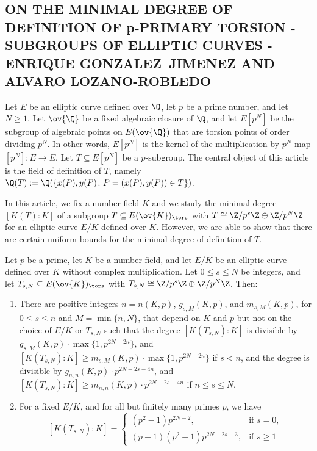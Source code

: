 \subsection{ON THE MINIMAL DEGREE OF DEFINITION OF p-PRIMARY TORSION - SUBGROUPS OF ELLIPTIC CURVES - ENRIQUE GONZALEZ–JIMENEZ AND ALVARO LOZANO-ROBLEDO}

Let $E$ be an elliptic curve defined over $\Q$, let $p$ be a prime number, and let $N \geq 1$. Let $\ov{\Q}$ be a fixed algebraic closure of $\Q$, and let $E[p^N]$ be the subgroup of algebraic points on $E(\ov{\Q})$ that are torsion points of order dividing $p^N$. In other words, $E[p^N]$ is the kernel of the multiplication-by-$p^N$ map $[p^N]: E \to E$. Let $T \subseteq E[p^N]$ be a $p$-subgroup. The central object of this article is the field of definition of $T$, namely $\Q(T):= \Q(\{x(P), y(P) \colon P= (x(P), y(P)) \in T \})$. 


In this article, we fix a number field $K$ and we study the minimal degree $[K(T) \colon K]$ of a subgroup $T \subseteq E(\ov{K})_\tors$ with $T \cong \Z/p^s\Z \oplus \Z/p^N\Z$ for an elliptic curve $E/K$ defined over $K$. However, we are able to show that there are certain uniform bounds for the minimal degree of definition of $T$.


\begin{thm} %
Let $p$ be a prime, let $K$ be a number field, and let $E/K$ be an elliptic curve defined over $K$ without complex multiplication. Let $0 \leq s \leq N$ be integers, and let $T_{s,N} \subseteq E(\ov{K})_\tors$ with $T_{s,N} \cong \Z/p^s\Z \oplus \Z/p^N\Z$. Then:
	\begin{enumerate}[(1)]
	\item There are positive integers $n= n(K,p)$, $g_{s,M}(K,p)$, and $m_{s,M}(K,p)$, for $0 \leq s \leq n$ and $M= \min\{n,N\}$, that depend on $K$ and $p$ but not on the choice of $E/K$ or $T_{s,N}$ such that the degree $[K(T_{s,N}) \colon K]$ is divisible by $g_{s,M}(K,p) \cdot \max\{1,p^{2N - 2n}\}$, and $[K(T_{s,N}) \colon K] \geq m_{s,M}(K,p) \cdot \max\{1,p^{2N - 2n} \}$ if $s < n$, and the degree is divisible by $g_{n,n}(K,p) \cdot p^{2N + 2s - 4n}$, and $[K(T_{s,N}) \colon K] \geq m_{n,n}(K,p) \cdot p^{2N + 2s - 4n}$ if $n \leq s \leq N$. 
	\item For a fixed $E/K$, and for all but finitely many primes $p$, we have
		\[
		[K(T_{s,N}) \colon K]= 
		\begin{cases}
		(p^2 - 1) p^{2N - 2}, & \text{if } s= 0, \\
		(p - 1)(p^2 - 1) p^{2N + 2s - 3}, & \text{if } s \geq 1
		\end{cases}
		\]
	\end{enumerate}
\end{thm}


